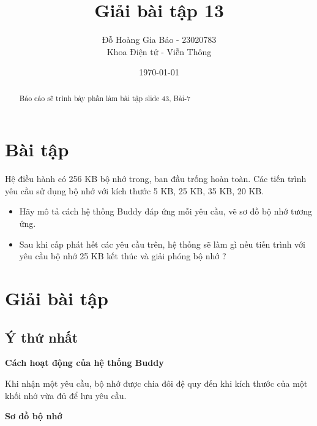 \documentclass[12pt, letterpaper]{article}
\title{Giải bài tập 13}
\author{Đỗ Hoàng Gia Bảo - 23020783 \\ \small Khoa Điện tử - Viễn Thông}
\date{\today}
\begin{document}
\maketitle

\begin{abstract}
Báo cáo sẽ trình bày phần làm bài tập slide 43, Bài-7
\end{abstract}
\newpage
\tableofcontents

\newpage
{}
\setcounter{page}{3} %

\section{Bài tập}
Hệ điều hành có 256 KB bộ nhớ trong, ban đầu trống hoàn
toàn. Các tiến trình yêu cầu sử dụng bộ nhớ với kích thước
5 KB, 25 KB, 35 KB, 20 KB.
\begin{itemize}
    \item Hãy mô tả cách hệ thống Buddy đáp ứng mỗi yêu cầu, vẽ sơ đồ bộ
nhớ tương ứng.
    \item Sau khi cấp phát hết các yêu cầu trên, hệ thống sẽ làm gì nếu tiến
trình với yêu cầu bộ nhớ 25 KB kết thúc và giải phóng bộ nhớ ?
\end{itemize}
\section{Giải bài tập}
\subsection{Ý thứ nhất}
\textbf{Cách hoạt động của hệ thống Buddy}

Khi nhận một yêu cầu, bộ nhớ được chia đôi đệ quy đến khi kích thước của một khối nhớ vừa đủ để lưu yêu cầu.

\noindent \textbf{Sơ đồ bộ nhớ}
\end{document}
